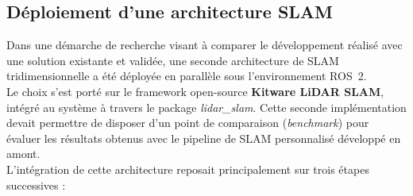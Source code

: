 \documentclass[12pt,a4paper,oneside]{report}
\begin{document}
\newpage

\subsection{Déploiement d'une architecture SLAM}

\hspace*{.3cm}Dans une démarche de recherche visant à comparer le développement réalisé avec une solution existante et validée, une seconde architecture de SLAM tridimensionnelle a été déployée en parallèle sous l'environnement ROS~2.\\

\hspace*{.3cm}Le choix s'est porté sur le framework open-source \textbf{Kitware LiDAR SLAM}, intégré au système à travers le package \textit{lidar\_slam}. Cette seconde implémentation devait permettre de disposer d'un point de comparaison (\textit{benchmark}) pour évaluer les résultats obtenus avec le pipeline de SLAM personnalisé développé en amont.\\

\hspace*{.3cm}L'intégration de cette architecture reposait principalement sur trois étapes successives :
\end{document}

